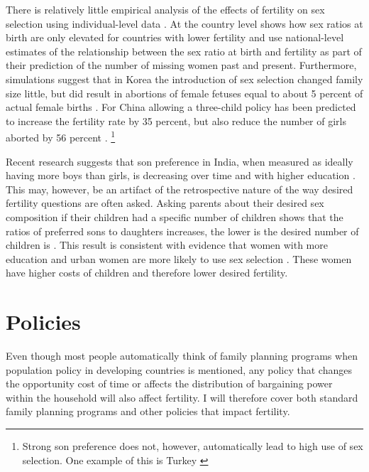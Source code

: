 \documentclass[letterpaper,12pt]{article}
\begin{document}
There is relatively little empirical analysis of the effects of
fertility on sex selection using individual-level data
\citep{park95,Ebenstein2011}.
At the country level \citet{Bongaarts2013} shows how sex ratios at birth
are only elevated for countries with lower fertility and
\citet{Bongaarts2015} use national-level estimates of the relationship
between the sex ratio at birth and fertility as part of their prediction
of the number of missing women past and present.
Furthermore, simulations suggest that in Korea the introduction of sex
selection changed family size little, but did result in abortions of
female fetuses equal to about 5 percent of actual female births
\citep{park95}.
For China allowing a three-child policy has been predicted to increase
the fertility rate by 35 percent, but also reduce the number of girls
aborted by 56 percent \citep{Ebenstein2011}.%
\footnote{
Strong son preference does not, however, automatically lead to high use
of sex selection.
One example of this is Turkey \citep{Altindag2016}}

Recent research suggests that son preference in India, when measured as
ideally having more boys than girls, is decreasing over time and with
higher education \citep{bhat03,pande07}.
This may, however, be an artifact of the retrospective nature of the way
desired fertility questions are often asked.
Asking parents about their desired sex composition if their children had
a specific number of children shows that the ratios of preferred sons to
daughters increases, the lower is the desired number of children is
\citep{Jayachandran2017}.
This result is consistent with evidence that women with more education
and urban women are more likely to use sex selection
\citet{Portner2015b}.
These women have higher costs of children and therefore lower desired
fertility.

\section{Policies}

Even though most people automatically think of family planning programs
when population policy in developing countries is mentioned, any policy
that changes the opportunity cost of time or affects the distribution of
bargaining power within the household will also affect fertility.
I will therefore cover both standard family planning programs and other
policies that impact fertility.
\end{document}
